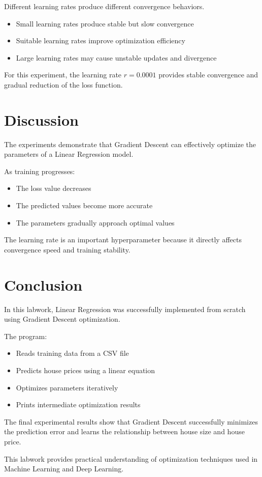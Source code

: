 \documentclass[12pt]{article}
\begin{document}
Different learning rates produce different convergence behaviors.

\begin{itemize}
    \item Small learning rates produce stable but slow convergence
    \item Suitable learning rates improve optimization efficiency
    \item Large learning rates may cause unstable updates and divergence
\end{itemize}

For this experiment, the learning rate \(r = 0.0001\) provides stable convergence and gradual reduction of the loss function.

\section{Discussion}

The experiments demonstrate that Gradient Descent can effectively optimize the parameters of a Linear Regression model.

As training progresses:
\begin{itemize}
    \item The loss value decreases
    \item The predicted values become more accurate
    \item The parameters gradually approach optimal values
\end{itemize}

The learning rate is an important hyperparameter because it directly affects convergence speed and training stability.

\section{Conclusion}

In this labwork, Linear Regression was successfully implemented from scratch using Gradient Descent optimization.

The program:
\begin{itemize}
    \item Reads training data from a CSV file
    \item Predicts house prices using a linear equation
    \item Optimizes parameters iteratively
    \item Prints intermediate optimization results
\end{itemize}

The final experimental results show that Gradient Descent successfully minimizes the prediction error and learns the relationship between house size and house price.

This labwork provides practical understanding of optimization techniques used in Machine Learning and Deep Learning.
\end{document}
